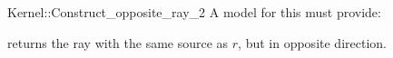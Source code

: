 \begin{ccRefFunctionObjectConcept}{Kernel::Construct_opposite_ray_2}
A model for this must provide:


{returns the ray with the same source as $r$, but in opposite direction.}

\ccIsModel{}

\end{ccRefFunctionObjectConcept}
